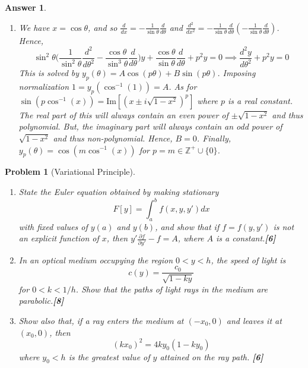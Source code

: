 \documentclass[a4paper]{article}
\newtheorem{ans}{Answer}[section]
\theoremstyle{new}
\newtheorem{qns}{Problem}[section]
\begin{document}
\begin{ans}
\begin{enumerate}[label=(\alph*)]
\begin{itemize}
\end{itemize}
\item We have $x=\cos\theta$, and so $\frac{d}{dx}=-\frac{1}{\sin\theta}\frac{d}{d\theta}$ and $\frac{d^2}{dx^2}=-\frac{1}{\sin\theta}\frac{d}{d\theta}(-\frac{1}{\sin\theta}\frac{d}{d\theta})$. Hence,
$$\sin^2\theta\bigg(\frac{1}{\sin^2\theta}\frac{d^2}{d\theta^2}-\frac{\cos\theta}{\sin^3\theta}\frac{d}{d\theta}\bigg)y+\frac{\cos\theta}{\sin\theta}\frac{d}{d\theta}+p^2y=0\implies\frac{d^2y}{d\theta^2}+p^2y=0$$
This is solved by $y_p(\theta)=A\cos(p\theta)+B\sin(p\theta)$. Imposing normalization $1=y_p(\cos^{-1}(1))=A$. As for $\sin(p\cos^{-1}(x))=\text{Im}[(x\pm i\sqrt{1-x^2})^p]$ where $p$ is a real constant. The real part of this will always contain an even power of $\pm\sqrt{1-x^2}$ and thus polynomial. But, the imaginary part will always contain an odd power of $\sqrt{1-x^2}$ and thus non-polynomial. Hence, $B=0$. Finally, $y_p(\theta)=\cos(m\cos^{-1}(x))$ for $p=m\in\mathbb{Z}^+\cup\{0\}$.
\end{enumerate}
\end{ans}
\begin{qns}[Variational Principle]\leavevmode
\begin{enumerate}[label=(\alph*)]
    \item State the Euler equation obtained by making stationary 
$$F[y]=\int_a^bf(x,y,y')dx$$
with fixed values of $y(a)$ and $y(b)$, and show that if $f=f(y,y')$ is not an explicit function of $x$, then $y'\frac{\partial f}{\partial y'}-f=A$, where $A$ is a constant.\hfill \textbf{[6]}
\item In an optical medium occupying the region $0<y<h$, the speed of light is
$$c(y)=\frac{c_0}{\sqrt{1-ky}}$$
for $0<k<1/h$. Show that the paths of light rays in the medium are parabolic.\hfill \textbf{[8]}
\item Show also that, if a ray enters the medium at $(-x_0,0)$ and leaves it at $(x_0,0)$, then
$$(kx_0)^2=4ky_0(1-ky_0)$$
where $y_0<h$ is the greatest value of $y$ attained on the ray path. \hfill \textbf{[6]}
\end{enumerate}
\end{qns}
\end{document}

